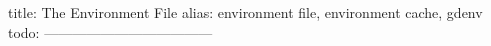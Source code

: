title: The Environment File
alias: environment file, environment cache, gdenv
todo:
------------------------------------
%
%
%
%
%
%
%
%
%
%
%
%
%
%
